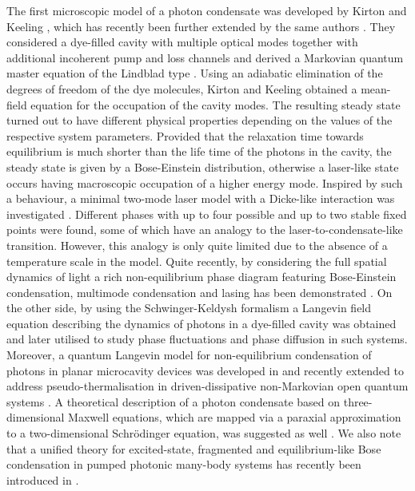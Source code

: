 \documentclass[12pt, a4paper]{iopart}
\begin{document}
The first microscopic model of a photon condensate was developed by Kirton and Keeling \cite{Keeling_PRL-nonequilibrium_model_photon-cond,Keeling-Thermalization_photon_condensate}, which has recently been further extended by the same authors \cite{Keeling-Spatial_dynamics,Keeling-Polarization}. They considered a dye-filled cavity with multiple optical modes together with additional incoherent pump and loss channels and derived a Markovian quantum master equation of the Lindblad type \cite{Haake, Lindblad}.
Using an adiabatic elimination of the degrees of freedom of the dye molecules, Kirton and Keeling obtained a mean-field equation for the occupation of the cavity modes. The resulting steady state turned out to have different physical properties depending on the values of the respective system parameters. Provided that the relaxation time towards equilibrium is much shorter than the life time of the photons in the cavity, the steady state is given by a Bose-Einstein distribution, otherwise a laser-like state occurs having macroscopic occupation of a higher energy mode.
Inspired by such a behaviour, a minimal two-mode laser model with a Dicke-like interaction was investigated \cite{Brandes}. Different phases with up to four possible and up to two stable fixed points were found, some of which have an analogy to the laser-to-condensate-like transition. However, this analogy is only quite limited due to the absence of a temperature scale in the model.
{Quite recently, by considering the full spatial dynamics of light \cite{Keeling-Spatial_dynamics} a rich non-equilibrium phase diagram featuring Bose-Einstein condensation, multimode condensation and lasing has been demonstrated \cite{Hesten_Decondensation}.} On the other side, by using the Schwinger-Keldysh formalism a Langevin field equation describing the dynamics of photons in a dye-filled cavity was obtained \cite{Stoof-Keldysh} and later utilised to study phase fluctuations \cite{Stoof-Fluctuations} and phase diffusion \cite{Stoof-Diffusion} in such systems. Moreover, a quantum Langevin model for non-equilibrium condensation of photons in planar microcavity devices was developed in \cite{Chiocchetta-qm_langevin_noneq_photon_condens} and recently extended to address pseudo-thermalisation in driven-dissipative non-Markovian open quantum systems \cite{Carusotto-Pseudo-thermalization}. A theoretical description of a photon condensate based on three-dimensional Maxwell equations, which are mapped via a paraxial approximation to a two-dimensional Schr\"{o}dinger equation, was suggested as well 
\cite{PhotonBEC-theoretic_descrip_based_on_maxwell-Nyman}. {We also note that a unified theory for excited-state, fragmented and equilibrium-like Bose condensation in pumped photonic many-body systems has recently been introduced in \cite{Eckardt_Unified_theory}.}
\end{document}
